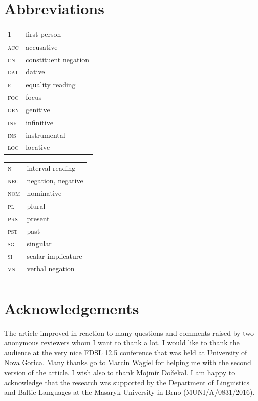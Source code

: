 \documentclass[output=paper,
]{langscibook}
\begin{document}
\section*{Abbreviations}

\begin{tabularx}{.48\textwidth}{lX}
\textsc{1}&first person\\
\textsc{acc}&accusative\\
\textsc{cn}&constituent negation\\
\textsc{dat}&dative\\
\textsc{e}&equality reading\\
\textsc{foc}&focus\\
\textsc{gen}&genitive\\
\textsc{inf}&infinitive\\
\textsc{ins}&instrumental\\
\textsc{loc}&locative\\
\end{tabularx}
\begin{tabularx}{.48\textwidth}{lX}
\textsc{n}&interval reading\\
\textsc{neg}&negation, negative\\
\textsc{nom}&nominative\\
\textsc{pl}&plural\\
\textsc{prs}&present\\
\textsc{pst}&past\\
\textsc{sg}&singular\\
\textsc{si}&scalar implicature\\
\textsc{vn}&verbal negation\\
&\\
\end{tabularx}

\section*{Acknowledgements}
The article improved in reaction to many questions and comments raised by two anonymous reviewers whom I want to thank a lot. I would like to thank the audience at the very nice FDSL 12.5 conference that was held at University of Nova Gorica. Many thanks go to Marcin Wągiel for helping me with the second version of the article. I wish also to thank Mojmír Dočekal. I am happy to acknowledge that the research was supported by the Department of Linguistics and Baltic Languages at the Masaryk University in Brno (MUNI/A/0831/2016).
 


\sloppy
\printbibliography[heading=subbibliography,notkeyword=this]
\end{document}

